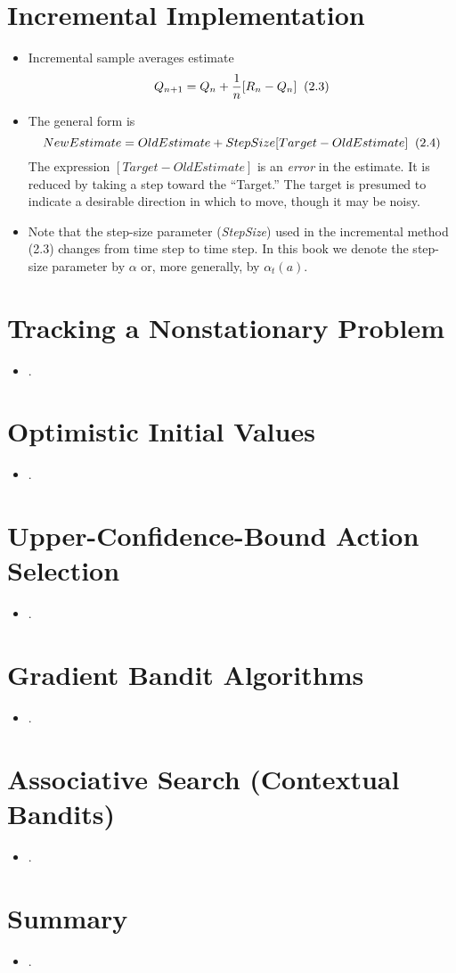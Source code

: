 \documentclass{article}
\begin{document}
\section{Incremental Implementation}
\begin{itemize}
    \item Incremental sample averages estimate 
    $$ Q_{n+1} = Q_n + \frac{1}{n}[R_n - Q_n] \thickspace \thickspace (2.3) $$
    \item The general form is
    $$ NewEstimate = OldEstimate + StepSize[Target - OldEstimate] \thickspace \thickspace (2.4) $$
    The expression $[Target - OldEstimate]$ is an \emph{error} in the estimate. It is reduced by taking
    a step toward the “Target.” The target is presumed to indicate a desirable direction in
    which to move, though it may be noisy.
    \item Note that the step-size parameter (\emph{StepSize}) used in the incremental method (2.3)
    changes from time step to time step. In this book we denote the step-size parameter
    by $\alpha$ \thickspace or, more generally, by $\alpha_t(a)$.
\end{itemize}

\section{Tracking a Nonstationary Problem}
\begin{itemize}
    \item .
\end{itemize}

\section{Optimistic Initial Values}
\begin{itemize}
    \item .
\end{itemize}

\section{Upper-Confidence-Bound Action Selection}
\begin{itemize}
    \item .
\end{itemize}

\section{Gradient Bandit Algorithms}
\begin{itemize}
    \item .
\end{itemize}

\section{Associative Search (Contextual Bandits)}
\begin{itemize}
    \item .
\end{itemize}

\section{Summary}
\begin{itemize}
    \item .
\end{itemize}
\end{document}
